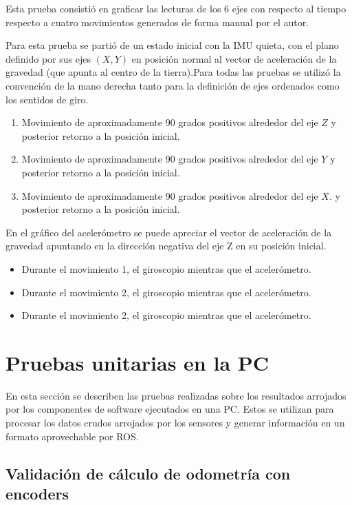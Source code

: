 Esta prueba consistió en graficar las lecturas de los 6 ejes con respecto al tiempo respecto a cuatro movimientos generados de forma manual por el autor.

Para esta prueba se partió de un estado inicial con la IMU quieta, con el plano definido por sus ejes $(X,Y)$ en posición normal al vector de aceleración de la gravedad (que apunta al centro de la tierra).Para todas las pruebas se utilizó la convención de la mano derecha tanto para la definición de ejes ordenados como los sentidos de giro.

\begin{enumerate}
    \item Movimiento de aproximadamente 90 grados positivos alrededor del eje $Z$ y posterior retorno a la posición inicial.
    \item Movimiento de aproximadamente 90 grados positivos alrededor del eje $Y$ y posterior retorno a la posición inicial.
    \item Movimiento de aproximadamente 90 grados positivos alrededor del eje $X$. y posterior retorno a la posición inicial.
\end{enumerate}

En el gráfico del acelerómetro se puede apreciar el vector de aceleración de la gravedad apuntando en la dirección negativa del eje Z en su posición inicial.
\begin{itemize}
    \item Durante el movimiento 1, el giroscopio mientras que el acelerómetro.
    \item Durante el movimiento 2, el giroscopio mientras que el acelerómetro.
    \item Durante el movimiento 2, el giroscopio mientras que el acelerómetro.
\end{itemize}

\section{Pruebas unitarias en la PC}

En esta sección se describen las pruebas realizadas sobre los resultados arrojados por los componentes de software ejecutados en una PC. Estos se utilizan para procesar los datos crudos arrojados por los sensores y generar información en un formato aprovechable por ROS.

\subsection{Validación de cálculo de odometría con encoders}

